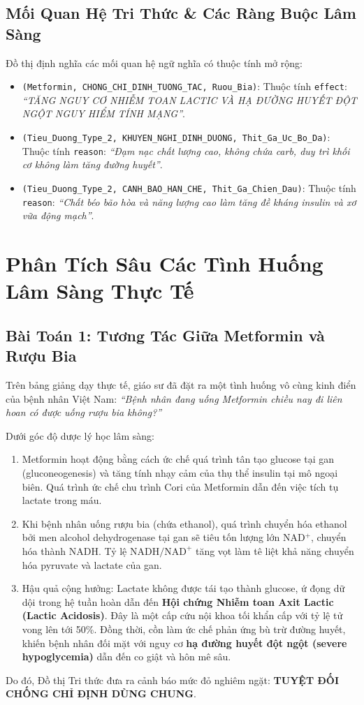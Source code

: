 \documentclass[12pt,a4paper]{report}
\begin{document}
\subsection{Mối Quan Hệ Tri Thức \& Các Ràng Buộc Lâm Sàng}
Đồ thị định nghĩa các mối quan hệ ngữ nghĩa có thuộc tính mở rộng:
\begin{itemize}
    \item \texttt{(Metformin, CHONG\_CHI\_DINH\_TUONG\_TAC, Ruou\_Bia)}: Thuộc tính \texttt{effect}: \textit{“TĂNG NGUY CƠ NHIỄM TOAN LACTIC VÀ HẠ ĐƯỜNG HUYẾT ĐỘT NGỘT NGUY HIỂM TÍNH MẠNG”}.
    \item \texttt{(Tieu\_Duong\_Type\_2, KHUYEN\_NGHI\_DINH\_DUONG, Thit\_Ga\_Uc\_Bo\_Da)}: Thuộc tính \texttt{reason}: \textit{“Đạm nạc chất lượng cao, không chứa carb, duy trì khối cơ không làm tăng đường huyết”}.
    \item \texttt{(Tieu\_Duong\_Type\_2, CANH\_BAO\_HAN\_CHE, Thit\_Ga\_Chien\_Dau)}: Thuộc tính \texttt{reason}: \textit{“Chất béo bão hòa và năng lượng cao làm tăng đề kháng insulin và xơ vữa động mạch”}.
\end{itemize}

\section{Phân Tích Sâu Các Tình Huống Lâm Sàng Thực Tế}

\subsection{Bài Toán 1: Tương Tác Giữa Metformin và Rượu Bia}
Trên bảng giảng dạy thực tế, giáo sư đã đặt ra một tình huống vô cùng kinh điển của bệnh nhân Việt Nam: \textit{“Bệnh nhân đang uống Metformin chiều nay đi liên hoan có được uống rượu bia không?”}

Dưới góc độ dược lý học lâm sàng:
\begin{enumerate}
    \item Metformin hoạt động bằng cách ức chế quá trình tân tạo glucose tại gan (gluconeogenesis) và tăng tính nhạy cảm của thụ thể insulin tại mô ngoại biên. Quá trình ức chế chu trình Cori của Metformin dẫn đến việc tích tụ lactate trong máu.
    \item Khi bệnh nhân uống rượu bia (chứa ethanol), quá trình chuyển hóa ethanol bởi men alcohol dehydrogenase tại gan sẽ tiêu tốn lượng lớn NAD$^+$, chuyển hóa thành NADH. Tỷ lệ $\text{NADH}/\text{NAD}^+$ tăng vọt làm tê liệt khả năng chuyển hóa pyruvate và lactate của gan.
    \item Hậu quả cộng hưởng: Lactate không được tái tạo thành glucose, ứ đọng dữ dội trong hệ tuần hoàn dẫn đến \textbf{Hội chứng Nhiễm toan Axit Lactic (Lactic Acidosis)}. Đây là một cấp cứu nội khoa tối khẩn cấp với tỷ lệ tử vong lên tới 50\%. Đồng thời, cồn làm ức chế phản ứng bù trừ đường huyết, khiến bệnh nhân đối mặt với nguy cơ \textbf{hạ đường huyết đột ngột (severe hypoglycemia)} dẫn đến co giật và hôn mê sâu.
\end{enumerate}
Do đó, Đồ thị Tri thức đưa ra cảnh báo mức đỏ nghiêm ngặt: \textbf{TUYỆT ĐỐI CHỐNG CHỈ ĐỊNH DÙNG CHUNG}.
\end{document}
